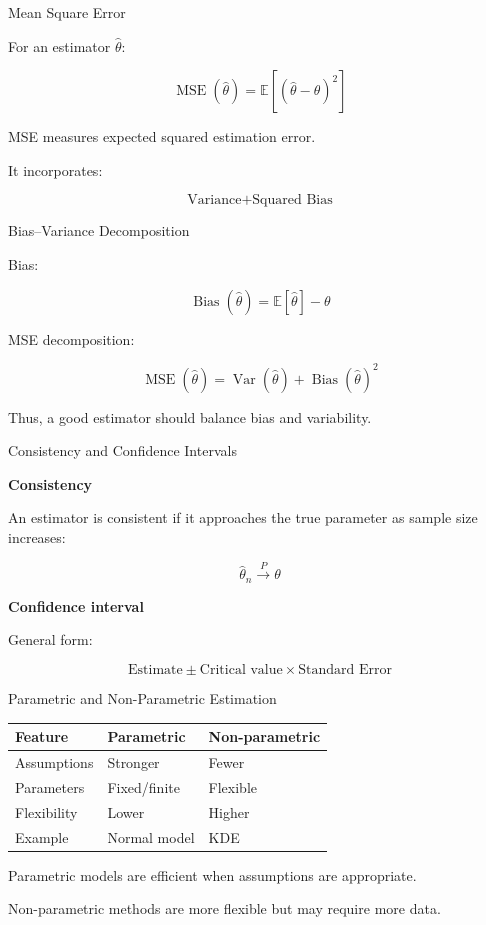 \documentclass[aspectratio=169,11pt]{beamer}
\newcommand{\E}{\mathbb{E}}
\newcommand{\Var}{\operatorname{Var}}
\newcommand{\Bias}{\operatorname{Bias}}
\newcommand{\MSE}{\operatorname{MSE}}
\begin{document}
\begin{frame}{Mean Square Error}

For an estimator $\hat\theta$:

\[
\boxed{
\MSE(\hat\theta)
=
\E[(\hat\theta-\theta)^2]
}
\]

MSE measures expected squared estimation error.

It incorporates:

\[
\boxed{
\text{Variance}+\text{Squared Bias}
}
\]

\end{frame}

\begin{frame}{Bias--Variance Decomposition}

Bias:

\[
\boxed{
\Bias(\hat\theta)
=
\E[\hat\theta]-\theta
}
\]

MSE decomposition:

\[
\boxed{
\MSE(\hat\theta)
=
\Var(\hat\theta)
+
\Bias(\hat\theta)^2
}
\]

Thus, a good estimator should balance bias and variability.

\end{frame}

\begin{frame}{Consistency and Confidence Intervals}

\textbf{Consistency}

An estimator is consistent if it approaches the true parameter as sample size increases:

\[
\boxed{
\hat\theta_n\xrightarrow{P}\theta
}
\]

\textbf{Confidence interval}

General form:

\[
\boxed{
\text{Estimate}
\pm
\text{Critical value}
\times
\text{Standard Error}
}
\]

\end{frame}

\begin{frame}{Parametric and Non-Parametric Estimation}

\begin{center}
\begin{tabular}{p{}p{}p{}}
\toprule
\textbf{Feature} & \textbf{Parametric} & \textbf{Non-parametric}\\
\midrule
Assumptions & Stronger & Fewer\\
Parameters & Fixed/finite & Flexible\\
Flexibility & Lower & Higher\\
Example & Normal model & KDE\\
\bottomrule
\end{tabular}
\end{center}

\vspace{0.3cm}

Parametric models are efficient when assumptions are appropriate.

Non-parametric methods are more flexible but may require more data.

\end{frame}
\end{document}
